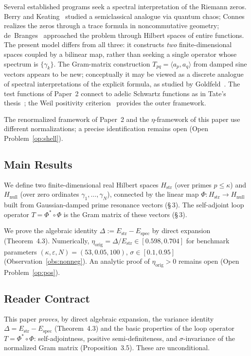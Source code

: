\documentclass[11pt]{article}
\newcommand{\Hstr}{H_{\mathrm{str}}}
\newcommand{\Hnull}{H_{\mathrm{null}}}
\newcommand{\Estr}{E_{\mathrm{str}}}
\newcommand{\Espec}{E_{\mathrm{spec}}}
\newcommand{\etaorig}{\eta_{\mathrm{orig}}}
\begin{document}
Several established programs seek a spectral interpretation of the
Riemann zeros. Berry and Keating~\cite{BerryKeating} studied a
semiclassical analogue via quantum chaos;
Connes~\cite{Connes} realizes the zeros through a trace formula in
noncommutative geometry;
de~Branges~\cite{deBranges} approached the problem through Hilbert
spaces of entire functions. The present model differs from all three:
it constructs \emph{two} finite-dimensional spaces coupled by a
bilinear map, rather than seeking a single operator whose spectrum is
$\{\gamma_k\}$. The Gram-matrix construction
$T_{pq}=\langle a_p,a_q\rangle$ from damped sine vectors appears to
be new; conceptually it may be viewed as a discrete analogue of
spectral interpretations of the explicit formula, as studied by
Goldfeld~\cite{Goldfeld}. The test functions of Paper~2 connect to
adelic Schwartz functions as in Tate's thesis~\cite{Tate}; the Weil
positivity criterion~\cite{Weil,Lagarias} provides the outer
framework.

The renormalized framework of Paper~2 and the $\eta$-framework of
this paper use different normalizations; a precise identification
remains open (Open Problem~\ref{op:shell}).

\subsection{Main Results}

We define two finite-dimensional real Hilbert spaces $\Hstr$ (over
primes $p\le\kappa$) and $\Hnull$ (over zero ordinates
$\gamma_1,\ldots,\gamma_N$), connected by the linear map
$\Phi:\Hstr\to\Hnull$ built from Gaussian-damped prime resonance
vectors (\S\,3). The self-adjoint loop operator $T=\Phi^*\circ\Phi$
is the Gram matrix of these vectors (\S\,3).

We prove the algebraic identity $\Delta:=\Estr-\Espec$ by direct
expansion (Theorem~4.3). Numerically, $\etaorig=\Delta/\Estr\in
[0.598,0.704]$ for benchmark parameters
$(\kappa,\varepsilon,N)=(53,0.05,100)$, $\sigma\in[0.1,0.95]$
(Observation~\ref{obs:nonneg}). An analytic proof of $\etaorig>0$ remains open
(Open Problem~\ref{op:pos}).

\subsection{Reader Contract}

This paper \emph{proves}, by direct algebraic expansion, the
variance identity $\Delta=\Estr-\Espec$ (Theorem~4.3) and the basic
properties of the loop operator $T=\Phi^*\circ\Phi$: self-adjointness,
positive semi-definiteness, and $\sigma$-invariance of the normalized
Gram matrix (Proposition~3.5). These are unconditional.
\end{document}
